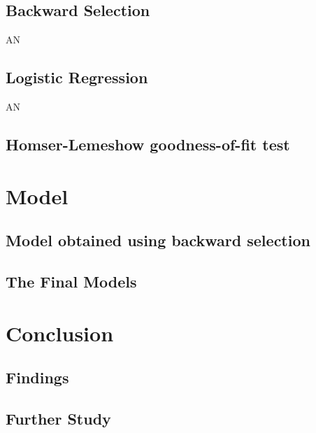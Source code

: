 \documentclass[12pt, oneside]{book}
\begin{document}
\hypertarget{backward-selection}{%
\section{Backward Selection}\label{backward-selection}}

AN

\hypertarget{logistic-regression}{%
\section{Logistic Regression}\label{logistic-regression}}

AN

\hypertarget{homser-lemeshow-goodness-of-fit-test}{%
\section{Homser-Lemeshow goodness-of-fit
test}\label{homser-lemeshow-goodness-of-fit-test}}

\hypertarget{model}{%
\chapter{Model}\label{model}}

\hypertarget{model-obtained-using-backward-selection}{%
\section{Model obtained using backward
selection}\label{model-obtained-using-backward-selection}}

\hypertarget{the-final-models}{%
\section{The Final Models}\label{the-final-models}}

\hypertarget{conclusion}{%
\chapter{Conclusion}\label{conclusion}}

\hypertarget{findings}{%
\section{Findings}\label{findings}}

\hypertarget{further-study}{%
\section{Further Study}\label{further-study}}


\end{document}
